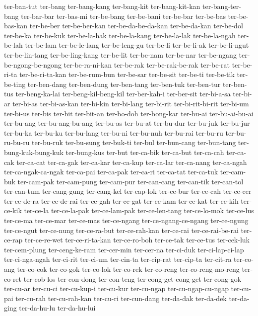 {ter-ban-tut ter-bang ter-bang-kang ter-bang-kit ter-bang-kit-kan
ter-bang-ter-bang ter-bar-bar ter-bas-mi ter-be-bang ter-be-bani
ter-be-bar ter-be-bas ter-be-bas-kan ter-be-ber ter-be-ber-kan
ter-be-da-be-da-kan ter-be-da-kan ter-be-dol ter-be-ka ter-be-kuk
ter-be-la-hak ter-be-la-kang ter-be-la-lak ter-be-la-ngah ter-be-lah
ter-be-lam ter-be-le-lang ter-be-leng-gu ter-be-li ter-be-li-ak
ter-be-li-ngut ter-be-lin-tang ter-be-ling-kang ter-be-lit ter-be-nam
ter-be-nar ter-be-ngang ter-be-ngong-be-ngong ter-be-ra-ni-kan ter-be-rak
ter-be-rak-be-rak ter-be-rat ter-be-ri-ta ter-be-ri-ta-kan ter-be-rum-bun
ter-be-sar ter-be-sit ter-be-ti ter-be-tik ter-be-ting ter-ben-dang
ter-ben-dung ter-ben-tang ter-ben-tuk ter-ben-tur ter-ben-tus
ter-beng-ka-lai ter-beng-kil-beng-kil ter-ber-kah-i ter-ber-sit
ter-bi-a-sa ter-bi-ar ter-bi-as ter-bi-as-kan ter-bi-kin ter-bi-lang
ter-bi-rit ter-bi-rit-bi-rit ter-bi-um ter-bi-us ter-bis ter-bit
ter-bit-an ter-bo-doh ter-bong-kar ter-bu-ai ter-bu-ai-bu-ai ter-bu-ang
ter-bu-ang-bu-ang ter-bu-as ter-bu-at ter-bu-dur ter-bu-juk ter-bu-jur
ter-bu-ka ter-bu-ku ter-bu-lang ter-bu-ni ter-bu-nuh ter-bu-rai ter-bu-ru
ter-bu-ru-bu-ru ter-bu-ruk ter-bu-sung ter-buk-ti ter-bul ter-bun-cang
ter-bun-tang ter-bung-kuk-bung-kuk ter-bung-kus ter-but ter-ca-bik
ter-ca-but ter-ca-cah ter-ca-cak ter-ca-cat ter-ca-gak ter-ca-kar
ter-ca-kup ter-ca-lar ter-ca-nang ter-ca-ngah ter-ca-ngak-ca-ngak
ter-ca-pai ter-ca-pak ter-ca-ri ter-ca-tat ter-ca-tuk ter-cam-buk
ter-cam-pak ter-cam-pung ter-cam-pur ter-can-cang ter-can-tik ter-can-tol
ter-can-tum ter-cang-gung ter-cang-kel ter-cap-lok ter-ce-bur ter-ce-cah
ter-ce-cer ter-ce-de-ra ter-ce-de-rai ter-ce-gah ter-ce-gat ter-ce-kam
ter-ce-kat ter-ce-kih ter-ce-kik ter-ce-la ter-ce-la-pak ter-ce-lam-pak
ter-ce-len-tang ter-ce-lo-mok ter-ce-lus ter-ce-ma ter-ce-mar ter-ce-mas
ter-ce-ngang ter-ce-ngang-ce-ngang ter-ce-ngung ter-ce-ngut ter-ce-nung
ter-ce-ra-but ter-ce-rah-kan ter-ce-rai ter-ce-rai-be-rai ter-ce-rap
ter-ce-re-wet ter-ce-ri-ta-kan ter-ce-ro-boh ter-ce-tak ter-ce-tus
ter-cek-luk ter-cem-plung ter-ceng-ke-ram ter-cer-min ter-cer-na
ter-ci-duk ter-ci-lap-ci-lap ter-ci-nga-ngah ter-ci-rit ter-ci-um
ter-cin-ta ter-cip-rat ter-cip-ta ter-cit-ra ter-co-ang ter-co-cok
ter-co-gok ter-co-lok ter-co-rek ter-co-reng ter-co-reng-mo-reng
ter-co-ret ter-cob-los ter-con-dong ter-con-teng ter-cong-get-cong-get
ter-cong-gok ter-cu-ar ter-cu-ci ter-cu-kup-i ter-cu-kur ter-cu-ngap
ter-cu-ngap-cu-ngap ter-cu-pai ter-cu-rah ter-cu-rah-kan ter-cu-ri
ter-cun-dang ter-da-dak ter-da-dek ter-da-ging ter-da-hu-lu ter-da-hu-lui
}
